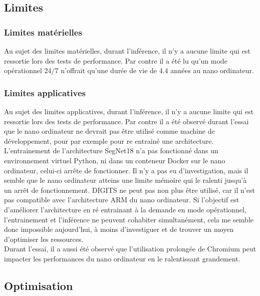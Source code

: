 \subsection{Limites}
\subsubsection{Limites matérielles}
\noindent Au sujet des limites matérielles, durant l'inférence, il n'y a aucune limite qui est ressortie lors des tests de performance. Par contre il a été lu qu'un mode opérationnel 24/7 n'offrait qu'une durée de vie de 4.4 années au nano ordinateur. 
\subsubsection{Limites applicatives}
\noindent Au sujet des limites applicatives, durant l'inférence, il n'y a aucune limite qui est ressortie lors des tests de performance. Par contre il a été observé durant l'essai que le nano ordinateur ne devrait pas être utilisé comme machine de développement, pour par exemple pour re entrainé une architecture. L'entrainement de l'architecture SegNet18 n'a pas fonctionné dans un environnement virtuel Python, ni dans un conteneur Docker sur le nano ordinateur, celui-ci arrête de fonctionner. Il n'y a pas eu d'investigation, mais il semble que le nano ordinateur atteins une limite mémoire qui le ralenti jusqu'à un arrêt de fonctionnement. DIGITS ne peut pas non plus être utilisé, car il n'est pas compatible avec l'architecture ARM du nano ordinateur. Si l'objectif est d'améliorer l'architecture en ré entrainant à la demande en mode opérationnel, l'entrainement et l'inférence ne peuvent cohabiter simultanément, cela me semble donc impossible aujourd'hui, à moins d'investiguer et de trouver un moyen d'optimiser les ressources.
\vspace{\baselineskip}
\\
\noindent Durant l'essai, il a aussi été observé que l'utilisation prolongée de Chromium peut impacter les performances du nano ordinateur en le ralentissant grandement. 
\subsection{Optimisation}
